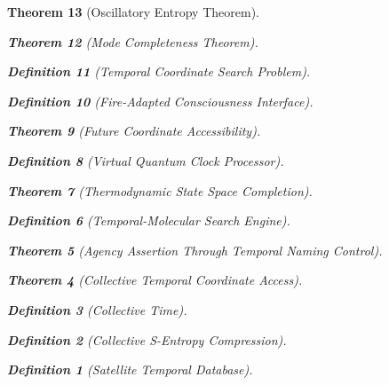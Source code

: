 \documentclass[12pt,a4paper]{article}
\newtheorem{theorem}{Theorem}[section]
\newtheorem{definition}[theorem]{Definition}
\begin{document}
\begin{theorem}[Oscillatory Entropy Theorem]
\begin{theorem}[Mode Completeness Theorem]
\begin{enumerate}
\begin{definition}[Temporal Coordinate Search Problem]
\begin{algorithm}
\begin{definition}[Fire-Adapted Consciousness Interface]
\begin{theorem}[Future Coordinate Accessibility]
\begin{definition}[Virtual Quantum Clock Processor]
\begin{itemize}
\begin{itemize}
\begin{theorem}[Thermodynamic State Space Completion]
\begin{definition}[Temporal-Molecular Search Engine]
\begin{theorem}[Agency Assertion Through Temporal Naming Control]
\begin{remark}
\begin{theorem}[Collective Temporal Coordinate Access]
\begin{definition}[Collective Time]
\begin{definition}[Collective S-Entropy Compression]
\begin{definition}[Satellite Temporal Database]
\begin{algorithm}
\begin{table}[h]
{\begin{figure}[h]
\centering
{}
\end{figure}}
\end{table}
\end{algorithm}
\end{definition}
\end{definition}
\end{definition}
\end{theorem}
\end{remark}
\end{theorem}
\end{definition}
\end{theorem}
\end{itemize}
\end{itemize}
\end{definition}
\end{theorem}
\end{definition}
\end{algorithm}
\end{definition}
\end{enumerate}
\end{theorem}
\end{theorem}
\end{document}
